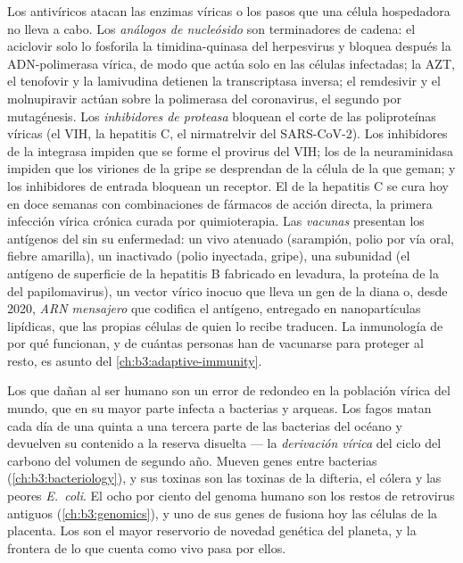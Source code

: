 \begin{definition}\label{def:b3:virology:drugs}
Los antivíricos atacan las enzimas víricas o los pasos que una célula
hospedadora no lleva a cabo. Los \emph{análogos de nucleósido} son
terminadores de cadena: el aciclovir solo lo fosforila la
timidina-quinasa del herpesvirus y bloquea después la ADN-polimerasa
vírica, de modo que actúa solo en las células infectadas; la AZT, el
tenofovir y la lamivudina detienen la transcriptasa inversa; el
remdesivir y el molnupiravir actúan sobre la polimerasa del coronavirus,
el segundo por mutagénesis. Los \emph{inhibidores de proteasa} bloquean
el corte de las poliproteínas víricas (el VIH, la hepatitis C, el
nirmatrelvir del SARS-CoV-2). Los inhibidores de la integrasa impiden que
se forme el provirus del VIH; los de la neuraminidasa impiden que los
viriones de la gripe se desprendan de la célula de la que geman; y los
inhibidores de entrada bloquean un receptor. El  de la hepatitis C
se cura hoy en doce semanas con combinaciones de fármacos de acción
directa, la primera infección vírica crónica curada por quimioterapia.
Las \emph{vacunas} presentan los antígenos del  sin su enfermedad:
un  vivo atenuado (sarampión, polio por vía oral, fiebre amarilla),
un  inactivado (polio inyectada, gripe), una subunidad (el antígeno
de superficie de la hepatitis B fabricado en levadura, la proteína de la
 del papilomavirus), un vector vírico inocuo que lleva un gen de
la diana o, desde 2020, \emph{ARN mensajero} que codifica el antígeno,
entregado en nanopartículas lipídicas, que las propias células de quien
lo recibe traducen. La inmunología de por qué funcionan, y de cuántas
personas han de vacunarse para proteger al resto, es asunto del
\cref{ch:b3:adaptive-immunity}.
\end{definition}

\begin{remark}\label{rem:b3:virology:economy}
Los  que dañan al ser humano son un error de redondeo en la
población vírica del mundo, que en su mayor parte infecta a bacterias y
arqueas. Los fagos matan cada día de una quinta a una tercera parte de
las bacterias del océano y devuelven su contenido a la reserva disuelta
--- la \emph{derivación vírica} del ciclo del carbono del volumen de
segundo año. Mueven genes entre bacterias (\cref{ch:b3:bacteriology}), y
sus toxinas son las toxinas de la difteria, el cólera y las peores
\emph{E.~coli}. El ocho por ciento del genoma humano son los restos de
retrovirus antiguos (\cref{ch:b3:genomics}), y uno de sus genes de
 fusiona hoy las células de la placenta. Los  son el mayor
reservorio de novedad genética del planeta, y la frontera de lo que
cuenta como vivo pasa por ellos.
\end{remark}

